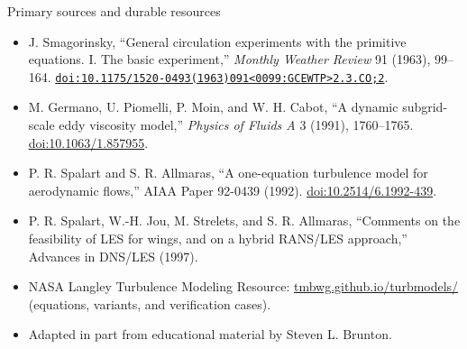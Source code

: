 \documentclass[aspectratio=169,11pt]{beamer}
\begin{document}
\begin{frame}{Primary sources and durable resources}
\footnotesize
\begin{itemize}\itemsep4pt
  \item J. Smagorinsky, ``General circulation experiments with the primitive equations. I. The basic experiment,'' \emph{Monthly Weather Review} 91 (1963), 99--164. \href{https://doi.org/10.1175/1520-0493(1963)091\%3C0099:GCEWTP\%3E2.3.CO;2}{\texttt{doi:10.1175/1520-0493(1963)091\textless{}0099:GCEWTP\textgreater{}2.3.CO;2}}.
  \item M. Germano, U. Piomelli, P. Moin, and W. H. Cabot, ``A dynamic subgrid-scale eddy viscosity model,'' \emph{Physics of Fluids A} 3 (1991), 1760--1765. \href{https://doi.org/10.1063/1.857955}{doi:10.1063/1.857955}.
  \item P. R. Spalart and S. R. Allmaras, ``A one-equation turbulence model for aerodynamic flows,'' AIAA Paper 92-0439 (1992). \href{https://doi.org/10.2514/6.1992-439}{doi:10.2514/6.1992-439}.
  \item P. R. Spalart, W.-H. Jou, M. Strelets, and S. R. Allmaras, ``Comments on the feasibility of LES for wings, and on a hybrid RANS/LES approach,'' Advances in DNS/LES (1997).
  \item NASA Langley Turbulence Modeling Resource: \href{https://tmbwg.github.io/turbmodels/}{tmbwg.github.io/turbmodels/} (equations, variants, and verification cases).
  \item Adapted in part from educational material by Steven L. Brunton.
\end{itemize}
\end{frame}
\end{document}
